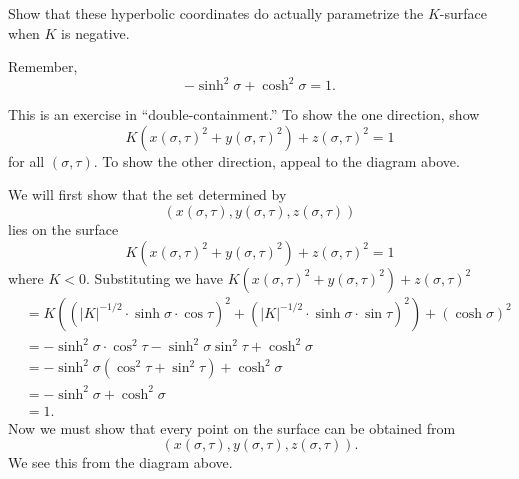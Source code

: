 \documentclass[newpage,hints,,12pt,noauthor,nooutcomes,handout]{ximera}
\begin{document}
\begin{problem}
Show that these hyperbolic coordinates do actually parametrize the
$K$-surface when $K$ is negative.
\begin{hint}
  Remember,
  \[
  -\sinh^2\sigma + \cosh^2\sigma =1.
  \]
\end{hint}
\begin{hint}
  This is an exercise in ``double-containment.'' To show the one
  direction, show
\[
K\left(x(\sigma,\tau)^{2}+y(\sigma,\tau)^{2}\right)+z(\sigma,\tau)^{2}=1
\]
for all $(\sigma,\tau)$. To show the other direction, appeal to the
diagram above.
\end{hint}
\begin{freeResponse}
  We will first show that the set determined by
  \[
  \left(x(\sigma,\tau), y(\sigma,\tau), z(\sigma,\tau)\right)
  \]
  lies on the surface
  \[
  K\left(x(\sigma,\tau) ^{2}+y(\sigma,\tau) ^{2}\right) +z(\sigma,\tau)^{2} = 1
  \]
  where $K<0$. Substituting we have
  $K\left(x(\sigma,\tau) ^{2}+y(\sigma,\tau) ^{2}\right)
  +z(\sigma,\tau)^{2}$
  \begin{align*}
    &=K\left((|K|^{-1/2}\cdot\sinh\sigma\cdot\cos\tau)^{2}+(|K|^{-1/2}\cdot\sinh\sigma\cdot\sin\tau)^{2}\right) +(\cosh\sigma)^{2} \\
    &= -\sinh^2\sigma\cdot\cos^2\tau-\sinh^2\sigma\sin^2\tau + \cosh^2\sigma \\
    &= -\sinh^2\sigma(\cos^2\tau+\sin^2\tau) + \cosh^2\sigma \\
    &= -\sinh^2\sigma + \cosh^2\sigma \\
    &=1.
  \end{align*}
  Now we must show that every point on the surface can be obtained from
  \[
  \left(x(\sigma,\tau), y(\sigma,\tau), z(\sigma,\tau)\right).
  \]
  We see this from the diagram above. 
\end{freeResponse}
\end{problem}
\end{document}
